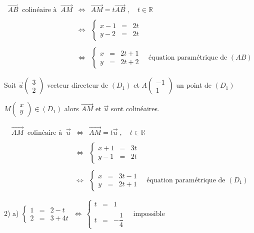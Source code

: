 \documentclass[12pt]{article}
\begin{document}
$$\begin{array}{rcl} \overrightarrow{AB}\ \text{ colinéaire à }\ \overrightarrow{AM}&\Leftrightarrow&\overrightarrow{AM}=t\overrightarrow{AB}\;,\quad t\in\mathbb{R}\\ \\ &\Leftrightarrow&\left\lbrace\begin{array}{rcl} x-1&=&2t \\ y-2&=&2t \end{array}\right.\\ \\ 
&\Leftrightarrow&\left\lbrace\begin{array}{rcl} x&=&2t+1 \\ y&=&2t+2\end{array}\right.\quad\text{équation paramétrique de }(AB)\end{array}$$

Soit $\vec{u}\begin{pmatrix} 3 \\ 2\end{pmatrix}$ vecteur directeur de $(D_{1})$ et $A\begin{pmatrix} -1 \\ 1\end{pmatrix}$ un point de $(D_{1})$

$M\begin{pmatrix} x \\ y\end{pmatrix}\in(D_{1})$ alors $\overrightarrow{AM}$ et $\vec{u}$ sont colinéaires.

$$\begin{array}{rcl} \overrightarrow{AM}\ \text{ colinéaire à }\ \vec{u}&\Leftrightarrow&\overrightarrow{AM}=t\vec{u}\;,\quad t\in\mathbb{R}\\ \\ &\Leftrightarrow&\left\lbrace\begin{array}{rcl} x+1&=&3t \\ y-1&=&2t \end{array}\right.\\ \\ &\Leftrightarrow&\left\lbrace\begin{array}{rcl} x&=&3t-1 \\ y&=&2t+1\end{array}\right.\quad\text{équation paramétrique de }(D_{1})\end{array}$$

2) a) $\left\lbrace\begin{array}{rcl} 1&=&2-t \\ 2&=&3+4t\end{array}\right.\ \Leftrightarrow\ \left\lbrace\begin{array}{rcl} t&=&1 \\ \\ t&=&-\dfrac{1}{4}\end{array}\right.\quad\text{impossible}$
\end{document}
